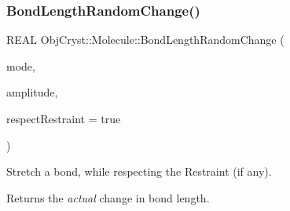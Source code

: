 \subsubsection{\texorpdfstring{BondLengthRandomChange()}{BondLengthRandomChange()}}
{\footnotesize\ttfamily R\+E\+AL Obj\+Cryst\+::\+Molecule\+::\+Bond\+Length\+Random\+Change (\begin{DoxyParamCaption}\item[{const \mbox{\hyperlink{struct_obj_cryst_1_1_stretch_mode_bond_length}{Stretch\+Mode\+Bond\+Length}} \&}]{mode,  }\item[{const R\+E\+AL}]{amplitude,  }\item[{const bool}]{respect\+Restraint = {\ttfamily true} }\end{DoxyParamCaption})}

Stretch a bond, while respecting the Restraint (if any).

\begin{DoxyReturn}{Returns}
the {\itshape actual} change in bond length. 
\end{DoxyReturn}

